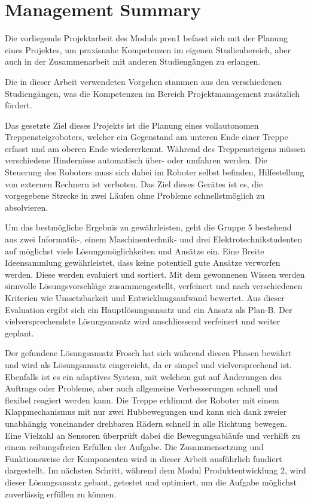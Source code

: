 \newpage
\section*{Management Summary}
Die vorliegende Projektarbeit des Moduls \acrfull{pren1} befasst sich mit der Planung eines Projektes, um praxisnahe Kompetenzen im eigenen Studienbereich, aber auch in der Zusammenarbeit mit anderen Studiengängen zu erlangen.

Die in dieser Arbeit verwendeten Vorgehen stammen aus den verschiedenen Studiengängen, was die Kompetenzen im Bereich Projektmanagement zusätzlich fördert.

Das gesetzte Ziel dieses Projekts ist die Planung eines vollautonomen Treppensteigroboters, welcher ein Gegenstand am unteren Ende einer Treppe erfasst und am oberen Ende wiedererkennt. Während des Treppensteigens müssen verschiedene Hindernisse automatisch über- oder umfahren werden. Die Steuerung des Roboters muss sich dabei im Roboter selbst befinden, Hilfestellung von externen Rechnern ist verboten. Das Ziel dieses Gerätes ist es, die vorgegebene Strecke in zwei Läufen ohne Probleme schnellstmöglich zu absolvieren.

Um das bestmögliche Ergebnis zu gewährleisten, geht die Gruppe 5 bestehend aus zwei Informatik-, einem Maschinentechnik- und drei Elektrotechnikstudenten auf möglichst viele Lösungsmöglichkeiten und Ansätze ein. Eine Breite Ideensammlung gewährleistet, dass keine potentiell gute Ansätze verworfen werden. Diese werden evaluiert und sortiert. Mit dem gewonnenen Wissen werden sinnvolle Lösungsvorschläge zusammengestellt, verfeinert und nach verschiedenen Kriterien wie Umsetzbarkeit und Entwicklungsaufwand bewertet. Aus dieser Evaluation ergibt sich ein Hauptlösungsansatz und ein Ansatz als Plan-B. Der vielversprechendste Lösungsansatz wird anschliessend verfeinert und weiter geplant.

Der gefundene Lösungsansatz \glqq Frosch\grqq{} hat sich während diesen Phasen bewährt und wird als Lösungsansatz eingereicht, da er simpel und vielversprechend ist. Ebenfalls ist es ein adaptives System, mit welchem gut auf Änderungen des Auftrags oder Probleme, aber auch allgemeine Verbesserungen schnell und flexibel reagiert werden kann. Die Treppe erklimmt der Roboter mit einem Klappmechanismus mit nur zwei Hubbewegungen und kann sich dank zweier unabhängig voneinander drehbaren Rädern schnell in alle Richtung bewegen. Eine Vielzahl an Sensoren überprüft dabei die Bewegungsabläufe und verhilft zu einem reibungsfreien Erfüllen der Aufgabe. Die Zusammensetzung und Funktionsweise der Komponenten wird in dieser Arbeit ausführlich fundiert dargestellt.
Im nächsten Schritt, während dem Modul Produktentwicklung 2, wird dieser Lösungsansatz gebaut, getestet und optimiert, um die Aufgabe möglichst zuverlässig erfüllen zu können.

